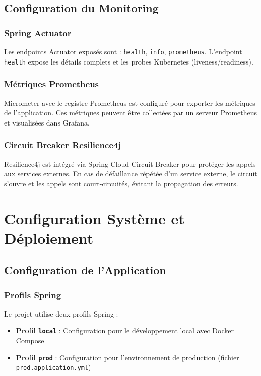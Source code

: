 \documentclass[12pt,a4paper]{report}
\begin{document}
\section{Configuration du Monitoring}

\subsection{Spring Actuator}

Les endpoints Actuator exposés sont : \texttt{health}, \texttt{info}, \texttt{prometheus}. L'endpoint \texttt{health} expose les détails complets et les probes Kubernetes (liveness/readiness).

\subsection{Métriques Prometheus}

Micrometer avec le registre Prometheus est configuré pour exporter les métriques de l'application. Ces métriques peuvent être collectées par un serveur Prometheus et visualisées dans Grafana.

\subsection{Circuit Breaker Resilience4j}

Resilience4j est intégré via Spring Cloud Circuit Breaker pour protéger les appels aux services externes. En cas de défaillance répétée d'un service externe, le circuit s'ouvre et les appels sont court-circuités, évitant la propagation des erreurs.

\chapter{Configuration Système et Déploiement}

\section{Configuration de l'Application}

\subsection{Profils Spring}

Le projet utilise deux profils Spring :
\begin{itemize}[leftmargin=2cm]
  \item \textbf{Profil \texttt{local}} : Configuration pour le développement local avec Docker Compose
  \item \textbf{Profil \texttt{prod}} : Configuration pour l'environnement de production (fichier \texttt{prod.application.yml})
\end{itemize}
\end{document}

